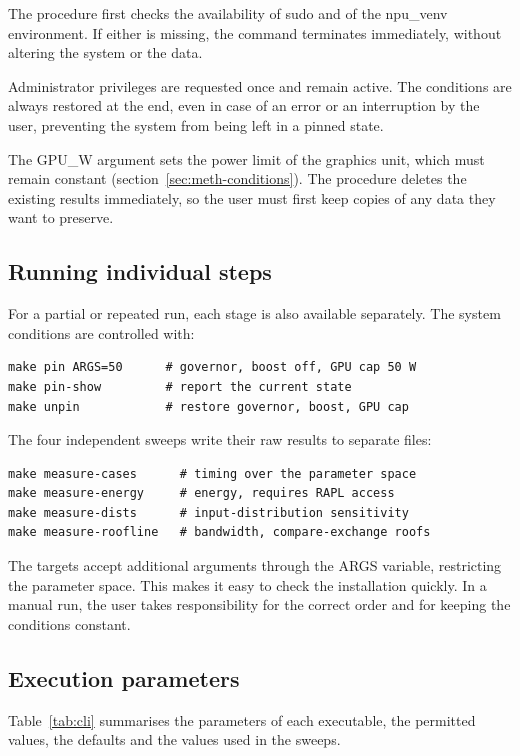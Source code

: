 The procedure first checks the availability of sudo and of the npu\_venv
environment. If either is missing, the command terminates immediately, without
altering the system or the data.

Administrator privileges are requested once and remain active. The conditions
are always restored at the end, even in case of an error or an interruption by
the user, preventing the system from being left in a pinned state.

The GPU\_W argument sets the power limit of the graphics unit, which must
remain constant (section~\ref{sec:meth-conditions}). The procedure deletes the
existing results immediately, so the user must first keep copies of any data
they want to preserve.

\subsection{Running individual steps}
\label{sec:repro-steps}

For a partial or repeated run, each stage is also available separately. The
system conditions are controlled with:

\begin{verbatim}
make pin ARGS=50      # governor, boost off, GPU cap 50 W
make pin-show         # report the current state
make unpin            # restore governor, boost, GPU cap
\end{verbatim}

The four independent sweeps write their raw results to separate files:

\begin{verbatim}
make measure-cases      # timing over the parameter space
make measure-energy     # energy, requires RAPL access
make measure-dists      # input-distribution sensitivity
make measure-roofline   # bandwidth, compare-exchange roofs
\end{verbatim}

The targets accept additional arguments through the ARGS variable, restricting
the parameter space. This makes it easy to check the installation quickly. In a
manual run, the user takes responsibility for the correct order and for keeping
the conditions constant.

\subsection{Execution parameters}
\label{sec:repro-cli}

Table~\ref{tab:cli} summarises the parameters of each executable, the permitted
values, the defaults and the values used in the sweeps.

